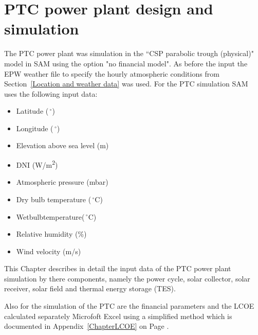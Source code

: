 \section{PTC power plant design  and simulation} \label{PTC power plant design  and simulation}
The PTC power plant was simulation in the “CSP parabolic trough (physical)" model in SAM using the option "no financial model". As before the input the EPW weather file to specify the hourly atmospheric conditions from Section~\ref{Location and weather data} was used. For the PTC simulation SAM uses the following input data:
\begin{itemize}
\item Latitude ($\,^{\circ}$)
\item Longitude ($\,^{\circ}$)
\item Elevation above sea level (m)
\item DNI (W/m\textsuperscript{2})
\item Atmospheric pressure (mbar)
\item Dry bulb temperature ($\,^{\circ}\mathrm{C}$)
\item Wetbulbtemperature($\,^{\circ}\mathrm{C}$)
\item Relative humidity (\%)
\item Wind velocity (m/s)
\end{itemize}
This Chapter describes in detail the input data of the PTC power plant simulation by there components, namely the  power cycle, solar collector, solar receiver, solar field and thermal energy storage (TES).

Also for the simulation of the PTC are the financial parameters and the LCOE calculated separately Microfoft Excel using a simplified method which is documented in Appendix~\ref{ChapterLCOE} on Page \pageref{ChapterLCOE}.
